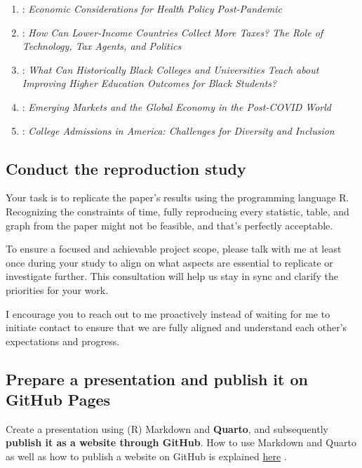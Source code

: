 \documentclass[
  a4paper,
  onecolumn,
  oneside]{scrartcl}
\begin{document}
\begin{enumerate}
{  International Perspective}
\item
  \citet{Morgan2023Economic}: \emph{Economic Considerations for Health
  Policy Post-Pandemic}
\item
  \citet{Okunogbe2024How}: \emph{How Can Lower-Income Countries Collect
  More Taxes? The Role of Technology, Tax Agents, and Politics}
\item
  \citet{Price2023What}: \emph{What Can Historically Black Colleges and
  Universities Teach about Improving Higher Education Outcomes for Black
  Students?}
\item
  \citet{Rogoff2022Emerging}: \emph{Emerging Markets and the Global
  Economy in the Post-COVID World}
\item
  \citet{Sloane2021College}: \emph{College Admissions in America:
  Challenges for Diversity and Inclusion}
\end{enumerate}

\subsection{Conduct the reproduction
study}\label{conduct-the-reproduction-study}

Your task is to replicate the paper's results using the programming
language R. Recognizing the constraints of time, fully reproducing every
statistic, table, and graph from the paper might not be feasible, and
that's perfectly acceptable.

To ensure a focused and achievable project scope, please talk with me at
least once during your study to align on what aspects are essential to
replicate or investigate further. This consultation will help us stay in
sync and clarify the priorities for your work.

I encourage you to reach out to me proactively instead of waiting for me
to initiate contact to ensure that we are fully aligned and understand
each other's expectations and progress.

\subsection{Prepare a presentation and publish it on GitHub
Pages}\label{prepare-a-presentation-and-publish-it-on-github-pages}

Create a presentation using (R) Markdown and \textbf{Quarto}, and
subsequently \textbf{publish it as a website through GitHub}. How to use
Markdown and Quarto as well as how to publish a website on GitHub is
explained \href{https://hubchev.github.io/dsbl/}{here}
\citep[see][]{Huber2024Data}.
\end{document}
